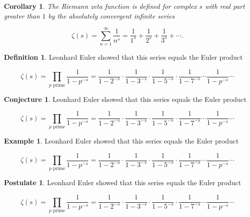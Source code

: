 \documentclass[english,oneside, article]{memoir}
\theoremstyle{plain}
\newtheorem*{Corollary}{Corollary}
\theoremstyle{definition}
\newtheorem{Definition}{Definition}[chapter]
\newtheorem{Conjecture}{Conjecture}[chapter]
\newtheorem{Example}{Example}[chapter]
\newtheorem{Postulate}{Postulate}[chapter]
\theoremstyle{remark}
\begin{document}
\begin{Corollary}

The Riemann zeta function is defined for complex \(s\) with real part
greater than \(1\) by the absolutely convergent infinite series

\[\zeta(s) = \sum_{n=1}^\infty \frac{1}{n^s} = \frac{1}{1^s} + \frac{1}{2^s} + \frac{1}{3^s} + \cdots.\]

\end{Corollary}

\begin{Definition}

Leonhard Euler showed that this series equals the Euler product

\[\zeta(s) = \prod_{p \text{ prime}} \frac{1}{1-p^{-s}}= \frac{1}{1-2^{-s}}\cdot\frac{1}{1-3^{-s}}\cdot\frac{1}{1-5^{-s}}\cdot\frac{1}{1-7^{-s}} \cdots \frac{1}{1-p^{-s}} \cdots\]

\end{Definition}

\begin{Conjecture}

Leonhard Euler showed that this series equals the Euler product

\[\zeta(s) = \prod_{p \text{ prime}} \frac{1}{1-p^{-s}}= \frac{1}{1-2^{-s}}\cdot\frac{1}{1-3^{-s}}\cdot\frac{1}{1-5^{-s}}\cdot\frac{1}{1-7^{-s}} \cdots \frac{1}{1-p^{-s}} \cdots\]

\end{Conjecture}

\begin{Example}

Leonhard Euler showed that this series equals the Euler product

\[\zeta(s) = \prod_{p \text{ prime}} \frac{1}{1-p^{-s}}= \frac{1}{1-2^{-s}}\cdot\frac{1}{1-3^{-s}}\cdot\frac{1}{1-5^{-s}}\cdot\frac{1}{1-7^{-s}} \cdots \frac{1}{1-p^{-s}} \cdots\]

\end{Example}

\begin{Postulate}

Leonhard Euler showed that this series equals the Euler product

\[\zeta(s) = \prod_{p \text{ prime}} \frac{1}{1-p^{-s}}= \frac{1}{1-2^{-s}}\cdot\frac{1}{1-3^{-s}}\cdot\frac{1}{1-5^{-s}}\cdot\frac{1}{1-7^{-s}} \cdots \frac{1}{1-p^{-s}} \cdots\]

\end{Postulate}
\end{document}
